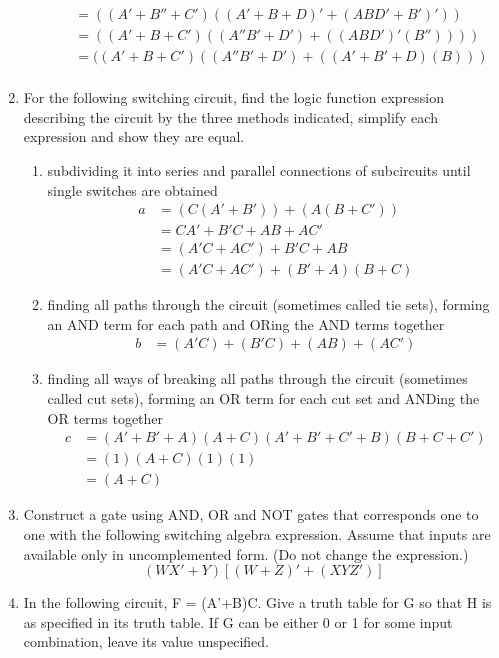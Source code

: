 \documentclass[12pt]{article}
\begin{document}
\begin{enumerate}
\begin{enumerate}
\begin{align*}
            &=  ((A'+B''+C')((A'+B+D)'+(ABD'+B')'))\\
            &=  ((A'+B+C')((A''B'+D')+((ABD')'(B''))))\\
            &=  ((A'+B+C')((A''B'+D')+((A'+B'+D)(B)))\\
        \end{align*}
    \end{enumerate}
      \addtocounter{enumi}{1}\item For the following switching circuit, find the logic function expression describing the circuit by the three methods indicated, simplify each expression and show they are equal. 
      \begin{enumerate}
          \item subdividing it into series and parallel connections of subcircuits until single switches are obtained
          \begin{align*}
            a &= (C(A'+B'))+(A(B+C'))\\
            &= CA'+B'C+AB+AC'\\
            &= (A'C + AC') + B'C + AB\\
            &= (A'C + AC') + (B'+A)(B+C)
          \end{align*}
          \item finding all paths through the circuit (sometimes called tie sets), forming an AND term for each path and ORing the AND terms together
          \begin{align*}
            b &= (A'C)+(B'C)+(AB)+(AC')
          \end{align*}
          \item finding all ways of breaking all paths through the circuit (sometimes called cut sets), forming an OR term for each cut set and ANDing the OR terms together
          \begin{align*}
              c&=(A'+B'+A)(A+C)(A'+B'+C'+B)(B+C+C')\\
              &= (1)(A+C)(1)(1)\\
              &= (A+C)
          \end{align*}
      \end{enumerate}
      \newpage\addtocounter{enumi}{1}\item Construct a gate using AND, OR and NOT gates that corresponds one to one with the following switching algebra expression. Assume that inputs are available only in uncomplemented form. (Do not change the expression.)
      \[(WX'+Y)[(W+Z)'+(XYZ')]\]
    \addtocounter{enumi}{1}\item In the following circuit, F = (A'+B)C. Give a truth table for G so that H is as specified in its truth table. If G can be either 0 or 1 for some input combination, leave its value unspecified.

\end{enumerate}
\end{document}
